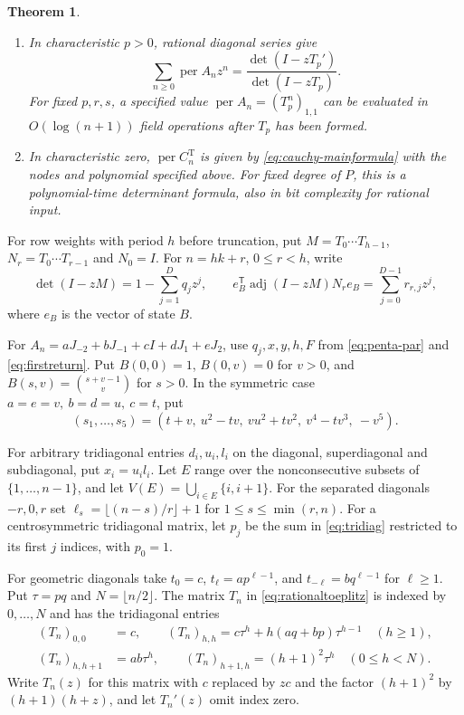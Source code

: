 \documentclass[11pt,reqno]{amsart}
\newtheorem{theorem}{Theorem}[section]
\theoremstyle{remark}
\numberwithin{equation}{section}
\newcommand{\per}{\operatorname{per}}
\begin{document}
\begin{theorem}
\begin{enumerate}
\item In characteristic \(p>0\), rational diagonal series give
\begin{equation}\label{eq:positive-toeplitz}
 \sum_{n\geq0}\per A_n z^n
        =\frac{\det(I-zT_p')}{\det(I-zT_p)}.
\end{equation}
For fixed \(p,r,s\), a specified value \(\per A_n=(T_p^n)_{1,1}\)
can be evaluated in \(O(\log(n+1))\) field operations after
\(T_p\) has been formed.

\item In characteristic zero, \(\per C_n^{\mathrm T}\) is given
by \eqref{eq:cauchy-mainformula} with the nodes and polynomial
specified above. For fixed degree of \(P\), this is a
polynomial-time determinant formula, also in bit complexity for
rational input.
\end{enumerate}
\end{theorem}

For row weights with period \(h\) before truncation, put
\(M=T_0\cdots T_{h-1}\), \(N_r=T_0\cdots T_{r-1}\) and \(N_0=I\).
For \(n=hk+r\), \(0\le r<h\), write
\[
 \det(I-zM)=1-\sum_{j=1}^Dq_jz^j,\qquad
 e_B^{\mathsf T}\operatorname{adj}(I-zM)N_re_B
       =\sum_{j=0}^{D-1}r_{r,j}z^j ,
\]
where \(e_B\) is the vector of state \(B\).

For \(A_n=aJ_{-2}+bJ_{-1}+cI+dJ_1+eJ_2\), use \(q_j,x,y,h,F\)
from \eqref{eq:penta-par} and \eqref{eq:firstreturn}. Put
\(B(0,0)=1\), \(B(0,v)=0\) for \(v>0\), and
\(B(s,v)=\binom{s+v-1}{v}\) for \(s>0\).
In the symmetric case \(a=e=v,\ b=d=u,\ c=t\), put
\[
 (s_1,\ldots,s_5)
 =(t+v,\ u^2-tv,\ vu^2+tv^2,\ v^4-tv^3,\ -v^5).
\]

For arbitrary tridiagonal entries \(d_i,u_i,l_i\) on the
diagonal, superdiagonal and subdiagonal, put \(x_i=u_il_i\).
Let \(E\) range over the nonconsecutive subsets of
\(\{1,\ldots,n-1\}\), and let \(V(E)=\bigcup_{i\in E}\{i,i+1\}\).
For the separated diagonals \(-r,0,r\) set
\(\ell_s=\lfloor(n-s)/r\rfloor+1\) for \(1\le s\le\min(r,n)\).
For a centrosymmetric tridiagonal matrix, let \(p_j\) be the
sum in \eqref{eq:tridiag} restricted to its first \(j\) indices,
with \(p_0=1\).

For geometric diagonals take \(t_0=c\), \(t_\ell=ap^{\ell-1}\),
and \(t_{-\ell}=bq^{\ell-1}\) for \(\ell\ge1\).
Put \(\tau=pq\) and \(N=\lfloor n/2\rfloor\). The matrix \(T_n\)
in \eqref{eq:rationaltoeplitz} is indexed by \(0,\ldots,N\) and
has the tridiagonal entries
\begin{equation}\label{eq:geometric}
 \begin{split}
 (T_n)_{0,0}&=c,\qquad
 (T_n)_{h,h}=c\tau^h+h(aq+bp)\tau^{h-1}\quad (h\geq1),\\
 (T_n)_{h,h+1}&=ab\tau^h,\qquad
 (T_n)_{h+1,h}=(h+1)^2\tau^h \quad (0\leq h<N).
 \end{split}
\end{equation}
Write \(T_n(z)\) for this matrix with \(c\) replaced by \(zc\)
and the factor \((h+1)^2\) by \((h+1)(h+z)\), and let \(T_n'(z)\)
omit index zero.
\end{document}
